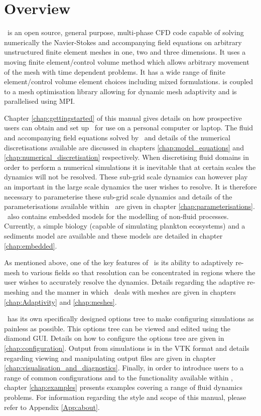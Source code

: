 \chapter*{Overview}

\fluidity\ is an open source, general purpose, multi-phase CFD code capable of solving numerically the Navier-Stokes and accompanying field equations on arbitrary unstructured finite element meshes in one, two and three dimensions. It uses a moving finite element/control volume method which allows arbitrary movement of the mesh with time dependent problems. It has a wide range of finite element/control volume element choices including mixed formulations. \fluidity is coupled to a mesh optimisation library allowing for dynamic mesh adaptivity and is parallelised using MPI.

Chapter \ref{chap:gettingstarted} of this manual gives details on how prospective users can obtain and set up \fluidity\ for use on a personal computer or laptop. The fluid and accompanying field equations solved by \fluidity\ and details of the numerical discretisations available are discussed in chapters \ref{chap:model_equations} and \ref{chap:numerical_discretisation} respectively. When discretising fluid domains in order to perform a numerical simulations it is inevitable that at certain scales the dynamics will not be resolved. These sub-grid scale dynamics can however play an important in the large scale dynamics the user wishes to resolve. It is therefore necessary to parameterise these sub-grid scale dynamics and details of the parameterisations available within \fluidity\ are given in chapter \ref{chap:parameterisations}. \fluidity\ also contains embedded models for the modelling of non-fluid processes. Currently, a simple biology (capable of simulating plankton ecosystems) and a sediments model are available and these models are detailed in chapter \ref{chap:embedded}.

As mentioned above, one of the key features of \fluidity\ is its ability to adaptively re-mesh to various fields so that resolution can be concentrated in regions where the user wishes to accurately resolve the dynamics. Details regarding the adaptive re-meshing and the manner in which \fluidity\ deals with meshes are given in chapters \ref{chap:Adaptivity} and \ref{chap:meshes}.

\fluidity\ has its own specifically designed options tree to make configuring simulations as painless as possible. This options tree can be viewed and edited using the diamond GUI. Details on how to configure the options tree are given in \ref{chap:configuration}. Output from simulations is in the VTK format and details regarding viewing and manipulating output files are given in chapter \ref{chap:visualisation_and_diagnostics}. Finally, in order to introduce users to a range of common configurations and to the functionality available within \fluidity, chapter \ref{chap:examples} presents examples covering a range of fluid dynamics problems. For information regarding the style and scope of this manual, please refer to Appendix \ref{App:about}.